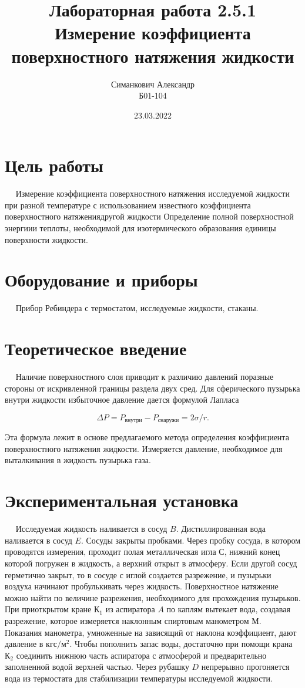\documentclass[12pt,a4paper]{article}
\title{Лабораторная работа 2.5.1\\ Измерение коэффициента поверхностного натяжения жидкости}
\author{Симанкович Александр \\ Б01-104}
\date{23.03.2022}
\begin{document}
	\maketitle
	
	\section*{Цель работы}
	
	$\quad$ Измерение коэффициента поверхностного натяжения исследуемой жидкости при разной температуре с использованием известного коэффициента поверхностного натяжениядругой жидкости
	Определение полной поверхностной энергиии теплоты, необходимой для изотермического образования единицы поверхности жидкости.
	
	\section*{Оборудование и приборы} 
	$\quad$ Прибор Ребиндера с термостатом, исследуемые жидкости, стаканы.
	
	\section*{Теоретическое введение}
	
	$\quad$ Наличие поверхностного слоя приводит к различию давлений поразные стороны от искривленной границы раздела двух сред. Для сферического пузырька внутри жидкости избыточное давление дается формулой Лапласа
	
	$$\Delta P = P_\text{внутри}-P_\text{снаружи}=2\sigma/r.$$
	
	Эта формула лежит в основе предлагаемого метода определения коэффициента поверхностного натяжения жидкости. Измеряется давление, необходимое для выталкивания в жидкость пузырька газа.
	
	\section*{Экспериментальная установка}
	
	$\quad$  Исследуемая жидкость наливается в сосуд $B$. Дистиллированная вода наливается в сосуд $E$. Сосуды закрыты пробками. Через пробку сосуда, в котором проводятся измерения, проходит полая металлическая игла $С$, нижний конец которой погружен в жидкость, а верхний открыт в атмосферу. Если другой сосуд герметично закрыт, то в сосуде с иглой создается разрежение, и пузырьки воздуха начинают пробулькивать через жидкость. Поверхностное натяжение можно найти по величине разрежения, необходимого для прохождения пузырьков. При приоткрытом кране $\text{К}_1$ из аспиратора $A$ по каплям вытекает вода, создавая разрежение, которое измеряется наклонным спиртовым манометром $М$. Показания манометра, умноженные на зависящий от наклона коэффициент, дают давление в $\text{кгс}/\text{м}^2$. Чтобы пополнить запас воды, достаточно при помощи крана $\text{К}_2$ соединить нижнюю часть аспиратора с атмосферой и предварительно заполненной водой верхней частью. Через рубашку $D$ непрерывно прогоняется вода из термостата для стабилизации температуры исследуемой жидкости.
	
\end{document}

